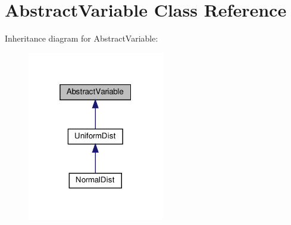 \hypertarget{classAbstractVariable}{}\section{Abstract\+Variable Class Reference}
\label{classAbstractVariable}


Inheritance diagram for Abstract\+Variable\+:\nopagebreak
\begin{figure}[H]
\begin{center}
\leavevmode
\includegraphics[width=169pt]{classAbstractVariable__inherit__graph}
\end{center}
\end{figure}
